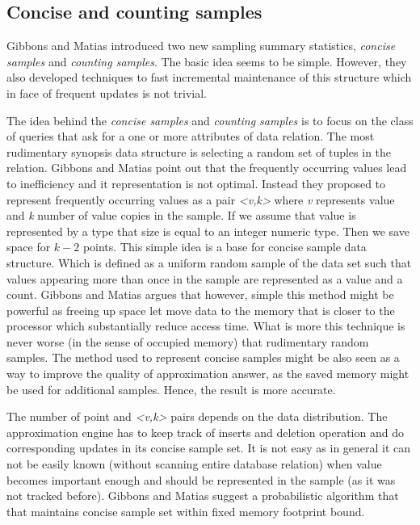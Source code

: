\subsection{Concise and counting samples}
Gibbons and Matias \cite{GM98} introduced two new sampling summary
statistics, \textit{concise samples} and \textit{counting
  samples}. The basic idea seems to be simple. However,
they also developed techniques to fast incremental maintenance of this
structure which in face of frequent updates is not trivial.

The idea behind the \textit{concise samples} and \textit{counting
  samples} is to focus on the class of queries that ask for a one or
more attributes of data relation. The most rudimentary synopsis data
structure is selecting a random set of tuples in the relation. Gibbons
and Matias point out that the frequently occurring values lead to
inefficiency and it representation is not optimal. Instead they
proposed to represent frequently occurring values as a pair
\textit{<v,k>} where \textit{v} represents value and \textit{k}
number of value copies in the sample. If we assume that value is
represented by a type that size is equal to an integer numeric
type. Then we save space for $ k - 2 $ points. This simple idea is a
base for concise sample data structure. Which is defined as a uniform
random sample of the data set such that values appearing more than
once in the sample are represented as a value and a count. Gibbons and
Matias argues that however, simple this method might be powerful as
freeing up space let move data to the memory that is closer to the
processor which substantially reduce access time. What is more this
technique is never worse (in the sense of occupied memory) that
rudimentary random samples. The method used to represent concise
samples might be also seen as a way to improve the quality of
approximation answer, as the saved memory might be used for additional
samples. Hence, the result is more accurate.

The number of point and \textit{<v,k>} pairs depends on the data
distribution. The approximation engine has to keep track of inserts
and deletion operation and do corresponding updates in its concise
sample set. It is not easy as in general it can not be easily known
(without scanning entire database relation) when value becomes
important enough and should be represented in the sample (as it was
not tracked before). Gibbons and Matias suggest a probabilistic
algorithm that that maintains concise sample set within fixed memory
footprint bound.

